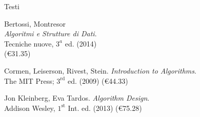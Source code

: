 \begin{frame}{Testi}


\vspace{-9pt}
\begin{myboxtitle}
\BI
\item Bertossi, Montresor\\
\alert{\emph{Algoritmi e Strutture di Dati}}. \\
Tecniche nuove, $3^a$ ed. (2014)\\
(\euro 31.35)
\EI
\end{myboxtitle}

\begin{myboxtitle}[Approfondimenti]
\BI
\item Cormen, Leiserson, Rivest, Stein. \alert{\emph{Introduction to Algorithms}}. \\The MIT Press; $3^{\textrm{rd}}$ ed. (2009) (\euro 44.33)
\item Jon Kleinberg, Eva Tardos. \alert{\emph{Algorithm Design}}. \\Addison Wesley, $1^{\textrm{st}}$ Int. ed. (2013) (\euro 75.28)
\EI
\end{myboxtitle}


\end{frame}
